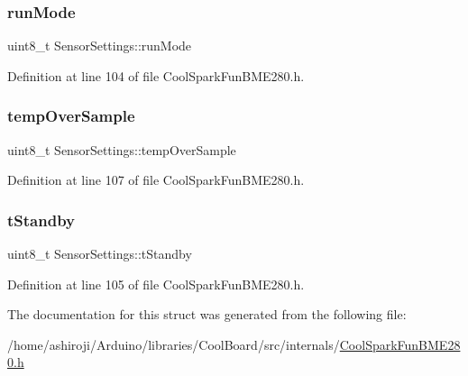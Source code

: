 \subsubsection{\texorpdfstring{run\+Mode}{runMode}}
{\footnotesize\ttfamily uint8\+\_\+t Sensor\+Settings\+::run\+Mode}



Definition at line 104 of file Cool\+Spark\+Fun\+B\+M\+E280.\+h.

\mbox{\label{struct_sensor_settings_abdedc9d05f4850c58005313486958073}} 
\subsubsection{\texorpdfstring{temp\+Over\+Sample}{tempOverSample}}
{\footnotesize\ttfamily uint8\+\_\+t Sensor\+Settings\+::temp\+Over\+Sample}



Definition at line 107 of file Cool\+Spark\+Fun\+B\+M\+E280.\+h.

\mbox{\label{struct_sensor_settings_a7098be3c1df0271dc9bc0fb45c1e9bb9}} 
\subsubsection{\texorpdfstring{t\+Standby}{tStandby}}
{\footnotesize\ttfamily uint8\+\_\+t Sensor\+Settings\+::t\+Standby}



Definition at line 105 of file Cool\+Spark\+Fun\+B\+M\+E280.\+h.



The documentation for this struct was generated from the following file\+:\begin{DoxyCompactItemize}
\item 
/home/ashiroji/\+Arduino/libraries/\+Cool\+Board/src/internals/\hyperlink{_cool_spark_fun_b_m_e280_8h}{Cool\+Spark\+Fun\+B\+M\+E280.\+h}\end{DoxyCompactItemize}
